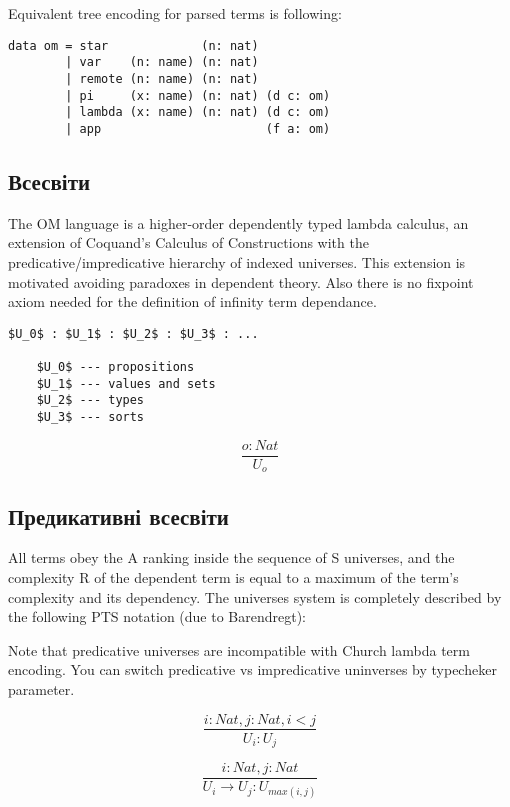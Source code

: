 Equivalent tree encoding for parsed terms is following:
\vspace{0.5cm}
\begin{lstlisting}[mathescape=true]
data om = star             (n: nat)
        | var    (n: name) (n: nat)
        | remote (n: name) (n: nat)
        | pi     (x: name) (n: nat) (d c: om)
        | lambda (x: name) (n: nat) (d c: om)
        | app                       (f a: om)
\end{lstlisting}

\subsection{Всесвіти}

The OM language is a higher-order dependently typed lambda calculus,
an extension of Coquand's Calculus of Constructions
with the predicative/impredicative hierarchy of indexed universes.
This extension is motivated avoiding paradoxes in dependent theory.
Also there is no fixpoint axiom needed for the definition
of infinity term dependance.

\vspace{0.5cm}
\begin{lstlisting}[mathescape=true]
    $U_0$ : $U_1$ : $U_2$ : $U_3$ : ...

    $U_0$ --- propositions
    $U_1$ --- values and sets
    $U_2$ --- types
    $U_3$ --- sorts
\end{lstlisting}

\begin{equation}
\tag{S}
\dfrac
{o : Nat}
{U_o}
\end{equation}

\newpage
\subsection*{Предикативні всесвіти}

All terms obey the A ranking inside the sequence of S universes,
and the complexity R of the dependent term is equal to a maximum of
the term's complexity and its dependency.
The universes system is completely described by the following
PTS notation (due to Barendregt):

Note that predicative universes are incompatible with Church lambda term encoding.
You can switch predicative vs impredicative uninverses by typecheker parameter.

\[
\tag{$A_1$}
\dfrac{i: Nat, j: Nat, i < j}{U_i : U_j}
\]

\[
\tag{$R_1$}
\dfrac{i : Nat, j : Nat}{U_i \rightarrow U_j : U_{max(i,j)} }
\]


